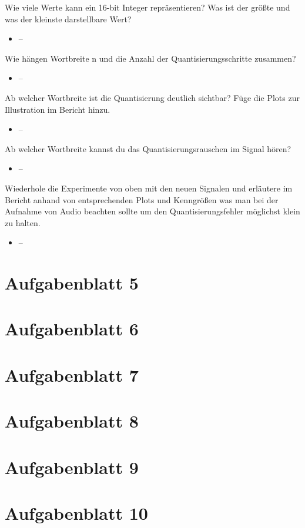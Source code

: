 \documentclass[a4paper, 11pt]{article}
\begin{document}
Wie viele Werte kann ein 16-bit Integer repräsentieren? Was ist der größte und was der kleinste darstellbare Wert?
    \begin{itemize}
    \item -- 
    \end{itemize}
Wie hängen Wortbreite n und die Anzahl der Quantisierungsschritte zusammen?
    \begin{itemize}
    \item -- 
    \end{itemize}
Ab welcher Wortbreite ist die Quantisierung deutlich sichtbar? Füge die Plots zur Illustration im Bericht hinzu.   
    \begin{itemize}
    \item --  
    \end{itemize}
Ab welcher Wortbreite kannst du das Quantisierungsrauschen im Signal hören?  
    \begin{itemize}
    \item --
    \end{itemize} 
Wiederhole die Experimente von oben mit den neuen Signalen und erläutere im Bericht anhand von entsprechenden Plots und Kenngrößen was man bei der Aufnahme von Audio beachten sollte um den Quantisierungsfehler möglichst klein zu halten.    
    \begin{itemize}
    \item --
    \end{itemize} 
\section{Aufgabenblatt 5}

\section{Aufgabenblatt 6}

\section{Aufgabenblatt 7}

\section{Aufgabenblatt 8}

\section{Aufgabenblatt 9}

\section{Aufgabenblatt 10}
\end{document}
